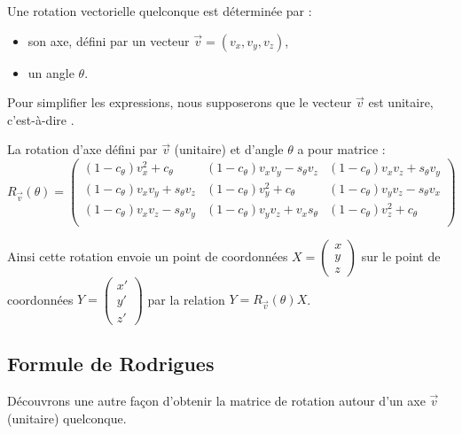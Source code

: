 \documentclass[11pt,class=report,crop=false]{standalone}
\begin{document}
Une rotation vectorielle quelconque est déterminée par :
\begin{itemize}
  \item son axe, défini par un vecteur $\vec v = (v_x, v_y, v_z)$,
  \item un angle $\theta$.
\end{itemize}
Pour simplifier les expressions, nous supposerons que le vecteur $\vec v$ est unitaire, c'est-à-dire .

La rotation d'axe défini par $\vec v$ (unitaire) et d'angle $\theta$ a pour matrice :
$$R_{\vec v}(\theta) = 
\begin{pmatrix}
(1-c_\theta)v_x^2 + c_\theta & (1-c_\theta) v_x v_y - s_\theta v_z & (1-c_\theta) v_x v_z + s_\theta v_y \\
(1-c_\theta) v_x v_y + s_\theta v_z & (1-c_\theta)v_y^2 + c_\theta & (1-c_\theta) v_y v_z - s_\theta v_x \\
 (1-c_\theta) v_x v_z - s_\theta v_y  & (1-c_\theta)v_y v_z + v_x s_\theta & (1-c_\theta)v_z^2 + c_\theta \\
\end{pmatrix}
$$

Ainsi cette rotation envoie un point de coordonnées $X = \left(\begin{smallmatrix} x\\y\\z \end{smallmatrix} \right)$ sur le point de coordonnées $Y = \left(\begin{smallmatrix} x'\\y'\\z' \end{smallmatrix} \right)$ par la relation 
$Y = R_{\vec v}(\theta) X$.

\subsection{Formule de Rodrigues}


Découvrons une autre façon d'obtenir la matrice de rotation autour d'un axe $\vec v$ (unitaire) quelconque.
\end{document}
